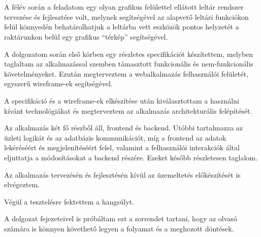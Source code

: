 \chapter{\bevezetes}

A félév során a feladatom egy olyan grafikus felülettel ellátott leltár rendszer tervezése és fejlesztése volt, melynek segítségével az alapvető leltári funkciókon felül könnyedén behatárolhatjuk a leltárba vett eszközök pontos helyzetét a raktárunkon belül egy grafikus “térkép” segítségével.

A dolgozatom során első körben egy részletes specifikációt készítettem, melyben taglaltam az alkalmazással szemben támasztott funkcionális és nem-funkcionális követelményeket.
Ezután megterveztem a webalkalmazás felhasználói felületét, egyszerű wireframe-ek segítségével.

A specifikáció és a wireframe-ek elkészítése után kiválasztottam a használni kívánt technológiákat és megterveztem az alkalmazás architekturális felépítését.

Az alkalmazás két fő részből áll, frontend és backend. Utóbbi tartalmazza az üzleti logikát és az adatbázis kommunikációt, míg a frontend az adatok lekéréséért és megjelenítéséért felel, valamint a felhasználói interakciók által eljuttatja a módosításokat a backend részére.
Ezeket később részletesen taglalom.

Az alkalmazás tervezésén és fejlesztésén kívül az üzemeltetés előkészítését is elvégeztem.

Végül a tesztelésre fektettem a hangsúlyt. 

A dolgozat fejezeteivel is próbáltam ezt a sorrendet tartani, hogy az olvasó számára is könnyen követhető legyen a folyamat és a meghozott döntések.